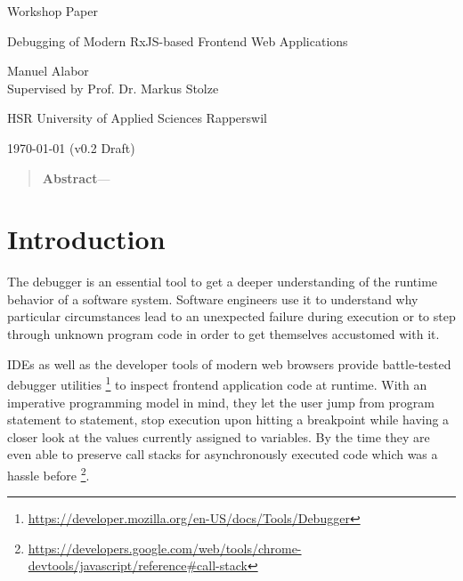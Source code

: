 \documentclass[12pt,a4paper]{article}
\newcommand{\version}{v0.2 Draft}
\begin{document}
\begin{centering}

	\Large{Workshop Paper}
	\par
	\Huge{Debugging of Modern RxJS-based Frontend Web Applications}
	\par
	\vspace{2ex}

	\normalsize{
		Manuel Alabor\\
		Supervised by Prof. Dr. Markus Stolze\\
		\par
		\vspace{2ex}
		HSR University of Applied Sciences Rapperswil\\
		\par
		\vspace{2ex}
		\today{} (\version)
	}
	\par
	\vspace{2ex}

	\begin{quotation}
		\small{
			\noindent\textbf{Abstract}---
		}
		\par
		\vspace{4ex}
	\end{quotation}
\end{centering}

\section{Introduction}

The debugger is an essential tool to get a deeper understanding of the runtime behavior of a software system. Software engineers use it to understand why particular circumstances lead to an unexpected failure during execution or to step through unknown program code in order to get themselves accustomed with it.

IDEs as well as the developer tools of modern web browsers provide battle-tested debugger utilities \footnote{\url{https://developer.mozilla.org/en-US/docs/Tools/Debugger}} to inspect frontend application code at runtime. With an imperative programming model in mind, they let the user jump from program statement to statement, stop execution upon hitting a breakpoint while having a closer look at the values currently assigned to variables. By the time they are even able to preserve call stacks for asynchronously executed code which was a hassle before \footnote{\url{https://developers.google.com/web/tools/chrome-devtools/javascript/reference\#call-stack}}.
\end{document}
